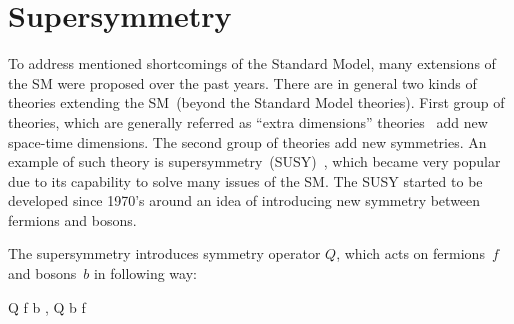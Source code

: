 




\section{Supersymmetry~\label{sec:SUSY}}

To address mentioned shortcomings of the Standard Model, many extensions of the SM were proposed over the past years. There are in general two kinds of theories extending the SM~(beyond the Standard Model theories). First group of theories, which are generally referred as ``extra dimensions'' theories~\cite{Patrignani:2016xqp} add new space-time dimensions. The second group of theories add new symmetries. An example of such theory is supersymmetry~(SUSY)~\cite{Martin:1997ns}, which became very popular due to its capability to solve many issues of the SM. The SUSY started to be developed since 1970's around an idea of introducing new symmetry between fermions and bosons.
  

The supersymmetry introduces symmetry operator $Q$, which acts on fermions~$f$ and bosons~$b$ in following way:

{
Q \mid f \rangle \to \mid b \rangle \to  , \; Q \mid b \rangle \to \mid f \rangle
}

